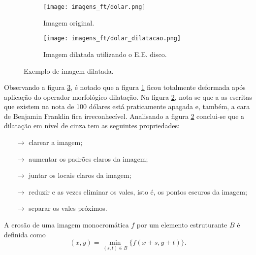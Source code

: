 \begin{figure}[h]
	\centering
	\begin{subfigure}[b]{0.45\textwidth}
		\centering
		\texttt{[image: imagens\_ft/dolar.png]}
		\caption{Imagem original.}
		\label{fig:dolar_mm_d}
	\end{subfigure}
	\hfill
	\begin{subfigure}[b]{0.45\textwidth}
		\centering
		\texttt{[image: imagens\_ft/dolar\_dilatacao.png]}
		\caption{Imagem dilatada utilizando o E.E. disco.}
		\label{fig:dolar_mm_dilatacao}
	\end{subfigure}
	\caption{Exemplo de imagem dilatada.}
	\label{fig:dilatacao_cinza}
\end{figure}

Observando a figura \ref{fig:dilatacao_cinza}, é notado que a figura \ref{fig:dolar_mm_d} ficou totalmente deformada após aplicação do operador morfológico dilatação. Na figura \ref{fig:dolar_mm_dilatacao}, nota-se que a as escritas que existem na nota de 100 dólares está praticamente apagada e, também, a cara de Benjamin Franklin fica irreconhecível. Analisando a figura \ref{fig:dolar_mm_dilatacao} conclui-se que a dilatação em nível de cinza tem as seguintes propriedades: 

\begin{itemize}
	\item[$\rightarrow$] clarear a imagem;
	\item[$\rightarrow$] aumentar os padrões claros da imagem;
	\item[$\rightarrow$] juntar os locais claros da imagem; 
	\item[$\rightarrow$] reduzir e as vezes eliminar os vales, isto é, os pontos escuros da imagem; 
	\item[$\rightarrow$] separar os vales próximos. 
\end{itemize}

\begin{define}
	A erosão de uma imagem monocromática $f$ por um elemento estruturante $B$ é definida como
	\begin{equation}
		[f \ominus B](x,y) = \min_{(s,t) \in B}\{f(x+s,y+t)\}.
	\end{equation}
\end{define}

